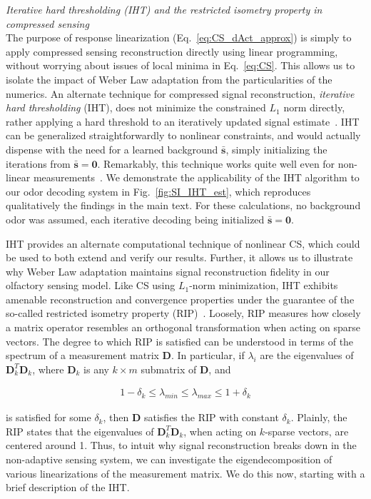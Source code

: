 \documentclass[10pt,prl,aps,showpacs,twocolumn,unsortedaddress,showkeys,linenumbers]{revtex4-1}
\begin{document}
\textit{Iterative hard thresholding (IHT) and the restricted isometry property in compressed sensing} \\


The purpose of response linearization (Eq.~\ref{eq:CS_dAct_approx}) is simply to apply compressed sensing reconstruction directly using linear programming, without worrying about issues of local minima in Eq.~\ref{eq:CS}. This allows us to isolate the impact  of Weber Law adaptation from the particularities of the numerics. An alternate technique for compressed signal reconstruction, \textit{iterative hard thresholding} (IHT), does not minimize the constrained $L_1$ norm directly, rather applying a hard threshold to an iteratively updated signal estimate~\cite{IHT}. IHT can be generalized straightforwardly to nonlinear constraints, and would actually dispense with the need for a learned background $\bar{\mathbf s}$, simply initializing the iterations from $\bar{\mathbf s} = \mathbf 0$. Remarkably, this technique works quite well even for non-linear measurements~\cite{nonlin_CS}. We demonstrate the applicability of the IHT algorithm to our odor decoding system in Fig.~\ref{fig:SI_IHT_est}, which reproduces qualitatively the findings in the main text. For these calculations, no background odor was assumed, each iterative decoding being initialized $\bar {\mathbf s} = \mathbf {0}$.

IHT provides an alternate computational technique of nonlinear CS, which could be used to both extend and verify our results. Further, it allows us to illustrate why Weber Law adaptation maintains signal reconstruction fidelity in our olfactory sensing model. Like CS using $L_1$-norm minimization, IHT exhibits amenable reconstruction and convergence properties under the guarantee of the so-called restricted isometry property (RIP)~\cite{CS_tao_2}. Loosely, RIP measures how closely a matrix operator resembles an orthogonal transformation when acting on sparse vectors. The degree to which RIP is satisfied can be understood in terms of the spectrum of a measurement matrix $\mathbf D$. In particular, if $\lambda_i$ are the eigenvalues of $\mathbf {D}_k^T\mathbf {D}_k$, where $\mathbf D_k$ is any $k \times m$ submatrix of $\mathbf D$, and 

\begin{align}
    1 - \delta_k \leq \lambda_{min} \leq \lambda_{max} \leq 1 + \delta_k
\end{align}

is satisfied for some $\delta_k$, then $\mathbf D$ satisfies the RIP with constant $\delta_k$. Plainly, the RIP states that the eigenvalues of $\mathbf {D}_k^T\mathbf {D}_k$, when acting on $k$-sparse vectors, are centered around 1. Thus, to intuit why signal reconstruction breaks down in the non-adaptive sensing system, we can investigate the eigendecomposition of various linearizations of the measurement matrix. We do this now, starting with a brief description of the IHT.
\end{document}
